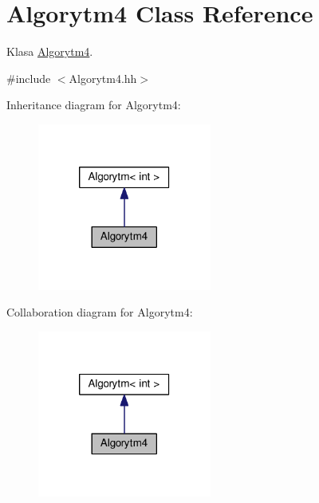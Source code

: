 \hypertarget{a00005}{}\section{Algorytm4 Class Reference}
\label{a00005}


Klasa \hyperlink{a00005}{Algorytm4}.  




{\ttfamily \#include $<$Algorytm4.\+hh$>$}



Inheritance diagram for Algorytm4\+:
\nopagebreak
\begin{figure}[H]
\begin{center}
\leavevmode
\includegraphics[width=162pt]{a00127}
\end{center}
\end{figure}


Collaboration diagram for Algorytm4\+:
\nopagebreak
\begin{figure}[H]
\begin{center}
\leavevmode
\includegraphics[width=162pt]{a00128}
\end{center}
\end{figure}
